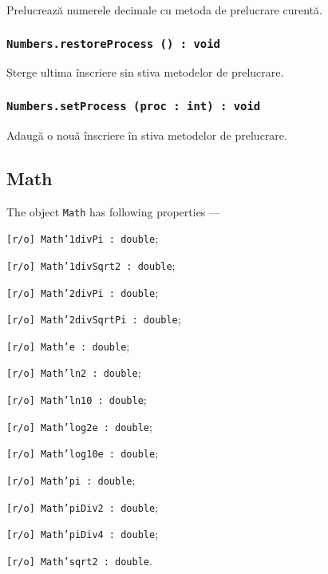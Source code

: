 Prelucrează numerele decimale cu metoda de prelucrare curentă.

\subsubsection{\texttt{Numbers.restoreProcess () : void}}

Șterge ultima înscriere sin stiva metodelor de prelucrare.

\subsubsection{\texttt{Numbers.setProcess (proc : int) : void}}

Adaugă o nouă înscriere în stiva metodelor de prelucrare.

\subsection{{\color{orange} Math}}

The object \texttt{Math} has following properties —
\begin{icItems}
	\item \texttt{[r/o] Math'1divPi : double};
	\item \texttt{[r/o] Math'1divSqrt2 : double};
	\item \texttt{[r/o] Math'2divPi : double};
	\item \texttt{[r/o] Math'2divSqrtPi : double};
	\item \texttt{[r/o] Math'e : double};
	\item \texttt{[r/o] Math'ln2 : double};
	\item \texttt{[r/o] Math'ln10 : double};
	\item \texttt{[r/o] Math'log2e : double};
	\item \texttt{[r/o] Math'log10e : double};
	\item \texttt{[r/o] Math'pi : double};
	\item \texttt{[r/o] Math'piDiv2 : double};
	\item \texttt{[r/o] Math'piDiv4 : double};
	\item \texttt{[r/o] Math'sqrt2 : double}.
\end{icItems}

